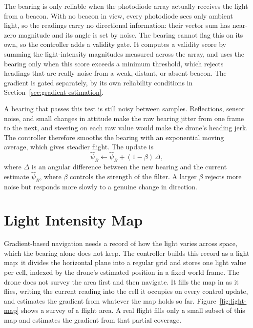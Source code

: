 The bearing is only reliable when the photodiode array actually receives the light from a beacon. With no beacon in view, every photodiode sees only ambient light, so the readings carry no directional information: their vector sum has near-zero magnitude and its angle is set by noise. The bearing cannot flag this on its own, so the controller adds a validity gate. It computes a validity score by summing the light-intensity magnitudes measured across the array, and uses the bearing only when this score exceeds a minimum threshold, which rejects headings that are really noise from a weak, distant, or absent beacon. The gradient is gated separately, by its own reliability conditions in Section~\ref{sec:gradient-estimation}.

A bearing that passes this test is still noisy between samples. Reflections, sensor noise, and small changes in attitude make the raw bearing jitter from one frame to the next, and steering on each raw value would make the drone's heading jerk. The controller therefore smooths the bearing with an exponential moving average, which gives steadier flight. The update is
\begin{equation}
\hat{\psi}_B \leftarrow \hat{\psi}_B + (1-\beta)\,\Delta,
\label{eq:bearing-filter}
\end{equation}
where $\Delta$ is an angular difference between the new bearing and the current estimate $\hat{\psi}_B$, where $\beta$ controls the strength of the filter. A larger $\beta$ rejects more noise but responds more slowly to a genuine change in direction.

\section{Light Intensity Map}
\label{sec:light-intensity-map}

Gradient-based navigation needs a record of how the light varies across space, which the bearing alone does not keep. The controller builds this record as a light map: it divides the horizontal plane into a regular grid and stores one light value per cell, indexed by the drone's estimated position in a fixed world frame. The drone does not survey the area first and then navigate. It fills the map in as it flies, writing the current reading into the cell it occupies on every control update, and estimates the gradient from whatever the map holds so far. Figure~\ref{fig:light-map} shows a survey of a flight area. A real flight fills only a small subset of this map and estimates the gradient from that partial coverage.


